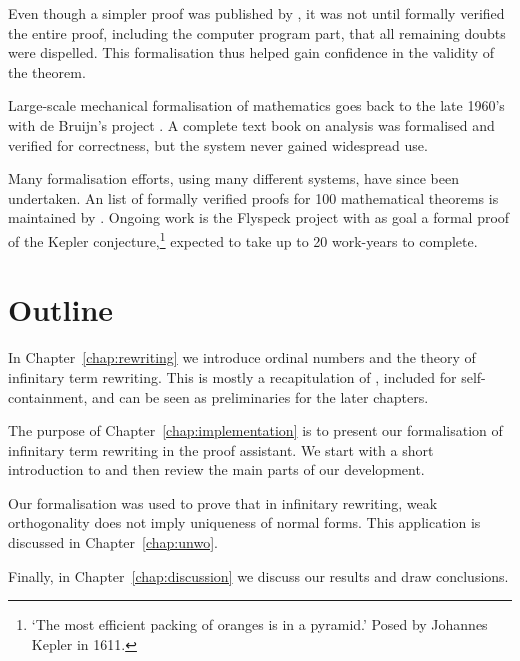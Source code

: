 Even though a simpler proof was published by \citet{robertson-97}, it
was not until \citet{gonthier-05} formally verified the entire proof,
including the computer program part, that all remaining doubts were
dispelled. This formalisation thus helped gain confidence in the
validity of the theorem.

Large-scale mechanical formalisation of mathematics goes back to the
late 1960's with de Bruijn's \Automath project
\citep{nederpelt-94}. A complete text book on analysis
\citep{landau-65} was formalised and verified for correctness, but the
system never gained widespread use.

Many formalisation efforts, using many different systems, have since
been undertaken. An list of formally verified proofs for 100
mathematical theorems is maintained by \citet{wiedijk-08}. Ongoing
work is the Flyspeck project \citep{hales-09} with as goal a formal
proof of the Kepler conjecture,\footnote{`The most efficient packing
  of oranges is in a pyramid.' Posed by Johannes Kepler in 1611.}
expected to take up to 20 work-years to complete.


\section*{Outline}

In Chapter~\ref{chap:rewriting} we introduce ordinal numbers and the
theory of infinitary term rewriting. This is mostly a recapitulation
of \citet{terese-03}, included for self-containment, and can be seen
as preliminaries for the later chapters.

The purpose of Chapter~\ref{chap:implementation} is to present our
formalisation of infinitary term rewriting in the \Coq proof
assistant. We start with a short introduction to \Coq and then review
the main parts of our development.

Our formalisation was used to prove that in infinitary rewriting, weak
orthogonality does not imply uniqueness of normal forms. This
application is discussed in Chapter~\ref{chap:unwo}.

Finally, in Chapter~\ref{chap:discussion} we discuss our results and
draw conclusions.
